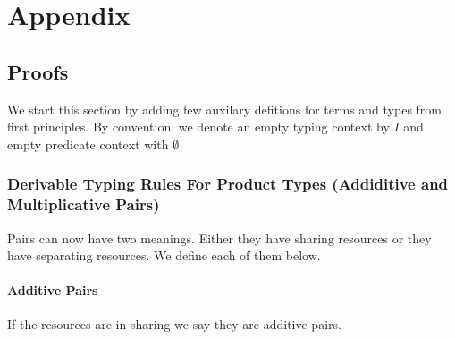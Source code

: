 \chapter{Appendix}

\section{Proofs}
We start this section by adding few auxilary defitions for terms and types from first principles.
By convention, we denote an empty typing context by $I$ and empty predicate context with $\emptyset$

\subsection{Derivable Typing Rules For Product Types (Addiditive and Multiplicative Pairs)}\label{sec:pairs}
Pairs can now have two meanings. Either they have sharing resources or they have separating resources. We define each
of them below.

\subsubsection{Additive Pairs}
If the resources are in sharing we say they are additive pairs.

